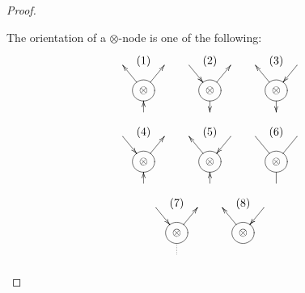 \begin{proof}
    \begin{claim*}
        The orientation of a \( \otimes \)-node is one of the following:
        \begin{gather*}
            \xymatrix@C=3mm@R=3mm{
                & \tiny (1) & \\
                &
                *++[o][F-]{\otimes} \ar[ul] \ar[ur] &
                \\
                & \ar[u] &
            }
            \quad
            \xymatrix@C=3mm@R=3mm{
                \ar[dr] & \tiny (2) & \\
                &
                *++[o][F-]{\otimes} \ar[ur] \ar[d] &
                \\
                & &
            }
            \quad
            \xymatrix@C=3mm@R=3mm{
                & \tiny (3) & \ar[dl] \\
                &
                *++[o][F-]{\otimes} \ar[ul] \ar[d] &
                \\
                & &
            }
            \\
            \xymatrix@C=3mm@R=3mm{
                \ar[dr] & \tiny (4) & \\
                &
                *++[o][F-]{\otimes} \ar[ur] &
                \\
                & \ar[u] &
            }
            \quad
            \xymatrix@C=3mm@R=3mm{
                & \tiny (5) & \ar[dl] \\
                &
                *++[o][F-]{\otimes} \ar[ul] &
                \\
                & \ar[u] &
            }
            \quad
            \xymatrix@C=3mm@R=3mm{
                & \tiny (6) & \\
                &
                *++[o][F-]{\otimes} \ar@{-}[ul] \ar@{-}[ur] \ar@{-}[d] &
                \\
                & &
            }
            \\
            \xymatrix@C=3mm@R=3mm{
                \ar[dr] & \tiny (7) & \\
                &
                *++[o][F-]{\otimes} \ar[ur] &
                \\
                & \ar@{..}[u] &
            }
            \quad
            \xymatrix@C=3mm@R=3mm{
                & \tiny (8) & \ar[dl] \\
                &
                *++[o][F-]{\otimes} \ar[ul] &
                \\
}
\end{gather*}
\end{claim*}
\end{proof}
